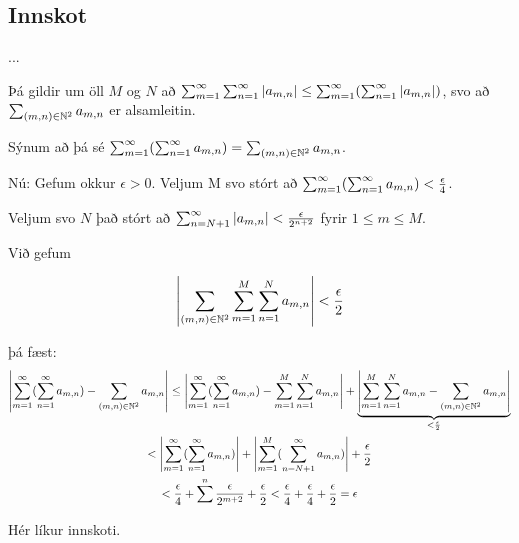 \documentclass[12pt]{book}
\begin{document}
\chapter{}

\section*{Innskot}

... %
{

\def\mn{(m,n)}
\def\amn{a_{m,n}}
\def\summn{\sum_{\mn \in \N^2}}

Þá gildir um öll $M$ og $N$ að $\sum_{m=1}^{\infty} \sum_{n=1}^{\infty} \abs{\amn} \leq \summinfty (\sumoinfty \abs{\amn})$, svo að $\sum_{\mn \in \N^2} \amn$ er alsamleitin.

Sýnum að þá sé $\summinfty ( \sumoinfty \amn ) = \summn \amn$.

Nú: Gefum okkur $\epsilon > 0$. Veljum M svo stórt að $\summinfty ( \sumoinfty \amn ) < \eps{4}$.

Veljum svo $N$ það stórt að $\sum_{n = N+1}^{\infty} \abs{\amn} < \eps{2^{n+2}}$ fyrir $1 \leq m \leq M$.


Við gefum 

\[\abs{\sum_{(m,n) \in \N^2} \sum_{m=1}^M \sum_{n=1}^N \amn } < \eps{2} \]

þá fæst: 
\begin{gather*}
\abs{\summinfty ( \sumoinfty \amn) - \sum_{(m,n) \in \N^2} \amn}  \leq \abs{\summinfty ( \sumoinfty \amn) - \sum_{m=1}^{M} \sum_{n=1}^N \amn} + \underbrace{\abs{\sum_{m=1}^M \sum_{n=1}^N \amn - \sum_{(m,n) \in \N^2} \amn}}_{< \eps{2}}\\
< \abs{\summinfty ( \sumoinfty \amn)} + \abs{\sum_{m=1}^M ( \sum_{n = N+1}^{\infty} \amn)} + \eps{2}\\
< \eps{4} + \sum^n \eps{2^{m+2}} + \eps{2} < \eps{4} + \eps{4} + \eps{2} = \epsilon
\end{gather*}

Hér líkur innskoti.

}

\section{}
\end{document}
